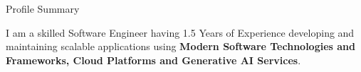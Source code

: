 \documentclass{resume} %
\begin{document}

\begin{rSection}{Profile Summary}

{\normalfont I am a skilled Software Engineer having 1.5 Years of Experience developing and maintaining scalable applications using \textbf{Modern Software  Technologies and Frameworks, Cloud Platforms and Generative AI Services}.}

\end{rSection}


\end{document}
